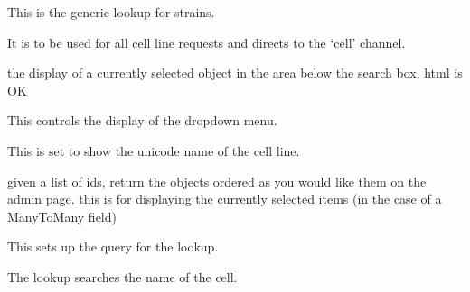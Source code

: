 \documentclass[letterpaper,10pt,english]{sphinxmanual}
\begin{document}

\begin{fulllineitems}
\label{api:experimentdb.reagents.lookups.CellLineLookup}
This is the generic lookup for strains.

It is to be used for all cell line requests and directs to the `cell' channel.

\begin{fulllineitems}
\label{api:experimentdb.reagents.lookups.CellLineLookup.format_item}
the display of a currently selected object in the area below the search box. html is OK

\end{fulllineitems}


\begin{fulllineitems}
\label{api:experimentdb.reagents.lookups.CellLineLookup.format_result}
This controls the display of the dropdown menu.

This is set to show the unicode name of the cell line.

\end{fulllineitems}


\begin{fulllineitems}
\label{api:experimentdb.reagents.lookups.CellLineLookup.get_objects}
given a list of ids, return the objects ordered as you would like them on the admin page.
this is for displaying the currently selected items (in the case of a ManyToMany field)

\end{fulllineitems}


\begin{fulllineitems}
\label{api:experimentdb.reagents.lookups.CellLineLookup.get_query}
This sets up the query for the lookup.

The lookup searches the name of the cell.

\end{fulllineitems}


\end{fulllineitems}
\end{document}
